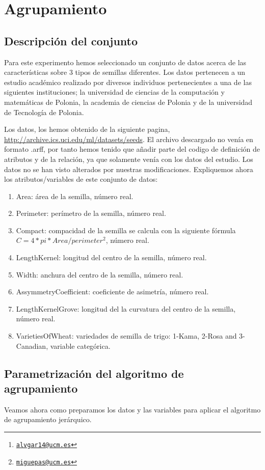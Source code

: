 \documentclass[a4paper, 11pt, twoside, openany, onecolumn, final]{memoir}
\title{\tb{Inteligencia artificial: Práctica $8$}}
\author{Álvaro García Tenorio \thanks{\texttt{\url{alvgar14@ucm.es}}}\and Miguel Pascual Domínguez\thanks{\texttt{\url{miguepas@ucm.es}}}}
\date{\today}
\begin{document}
	\maketitle
	\tableofcontents
	\chapter{Agrupamiento}
	\section{Descripción del conjunto}
	Para este experimento hemos seleccionado un conjunto de datos acerca de las características sobre 3 tipos de semillas diferentes. Los datos pertenecen a un estudio académico realizado por diversos individuos pertenecientes a una de las siguientes instituciones; la universidad de ciencias de la computación y matemáticas de Polonia, la academia de ciencias de Polonia y de la universidad de Tecnología de Polonia.
	
	Los datos, los hemos obtenido de la siguiente pagina, \url{http://archive.ics.uci.edu/ml/datasets/seeds}. El archivo descargado no venía en formato .arff, por tanto hemos tenido que añadir parte del codigo de definición de atributos y de la relación, ya que solamente venía con los datos del estudio. Los datos no se han visto alterados por nuestras modificaciones. Expliquemos ahora los atributos/variables de este conjunto de datos:
	
	\begin{enumerate}
\item Area: área de la semilla, número real.
\item Perimeter: perímetro de la semilla, número real.
\item Compact: compacidad de la semilla se calcula con la siguiente fórmula $C=4*pi*Area/perimeter^2$, número real.
\item LengthKernel: longitud del centro de la semilla, número real.
\item Width: anchura del centro de la semilla, número real.
\item AssymmetryCoefficient: coeficiente de asimetría, número real. 
\item LengthKernelGrove: longitud del la curvatura del centro de la semilla, número real.
\item VarietiesOfWheat: variedades de semilla de trigo: 1-Kama, 2-Rosa and 3-Canadian, variable categórica.
\end{enumerate}
	\section{Parametrización del algoritmo de agrupamiento}
	Veamos ahora como preparamos los datos y las variables para aplicar el algoritmo de agrupamiento jerárquico.
	
\end{document}
